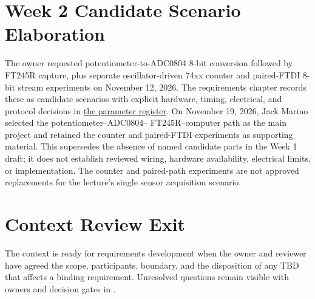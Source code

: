 \section{Week 2 Candidate Scenario Elaboration}
\label{Section:WeekTwoScenarioContext}
The owner requested potentiometer-to-ADC0804 8-bit conversion followed by
FT245R capture, plus separate oscillator-driven 74xx counter and paired-FTDI
8-bit stream experiments on November 12, 2026. The requirements chapter
records these as candidate scenarios with explicit hardware, timing,
electrical, and protocol decisions in
\hyperref[Table:RequirementParameters]{the parameter register}.
On November 19, 2026, Jack Marino selected the potentiometer--ADC0804--
FT245R--computer path as the main project and retained the counter and
paired-FTDI experiments as supporting material. This supersedes the absence
of named candidate parts in the Week 1 draft;
it does not establish reviewed wiring, hardware availability, electrical
limits, or implementation. The counter and paired-path experiments are not
approved replacements for the lecture's single sensor acquisition scenario.

\section{Context Review Exit}
The context is ready for requirements development when the owner and reviewer
have agreed the scope, participants, boundary, and the disposition of any TBD
that affects a binding requirement. Unresolved questions remain visible with
owners and decision gates in .
